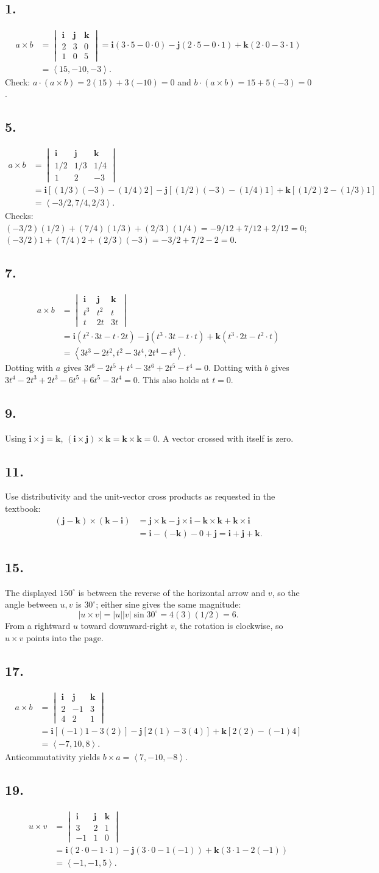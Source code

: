 \documentclass[11pt]{article}
\newcommand{\ex}[1]{\subsection*{#1.}}
\newcommand{\ans}[1]{\boxed{#1}}
\newcommand{\vv}[1]{\left\langle #1\right\rangle}
\newcommand{\ii}{\mathbf i}\newcommand{\jj}{\mathbf j}\newcommand{\kk}{\mathbf k}
\newcommand{\cp}[6]{\begin{vmatrix}\ii&\jj&\kk\\#1&#2&#3\\#4&#5&#6\end{vmatrix}}
\begin{document}
\ex{1}
\begin{align*}a\times b&=\cp{2}{3}{0}{1}{0}{5}
=\ii(3\cdot5-0\cdot0)-\jj(2\cdot5-0\cdot1)+\kk(2\cdot0-3\cdot1)\\&=\ans{\vv{15,-10,-3}}.
\end{align*}
Check: $a\cdot(a\times b)=2(15)+3(-10)=0$ and $b\cdot(a\times b)=15+5(-3)=0$.
\ex{5}
\begin{align*}a\times b&=\cp{1/2}{1/3}{1/4}{1}{2}{-3}\\
&=\ii[(1/3)(-3)-(1/4)2]-\jj[(1/2)(-3)-(1/4)1]+\kk[(1/2)2-(1/3)1]\\
&=\ans{\vv{-3/2,7/4,2/3}}.
\end{align*}
Checks: $(-3/2)(1/2)+(7/4)(1/3)+(2/3)(1/4)=-9/12+7/12+2/12=0$;
$(-3/2)1+(7/4)2+(2/3)(-3)=-3/2+7/2-2=0$.
\ex{7}
\begin{align*}a\times b&=\cp{t^3}{t^2}{t}{t}{2t}{3t}\\&=\ii(t^2\cdot3t-t\cdot2t)-\jj(t^3\cdot3t-t\cdot t)+\kk(t^3\cdot2t-t^2\cdot t)\\&=\ans{\vv{3t^3-2t^2,t^2-3t^4,2t^4-t^3}}.
\end{align*}
Dotting with $a$ gives $3t^6-2t^5+t^4-3t^6+2t^5-t^4=0$. Dotting with $b$ gives $3t^4-2t^3+2t^3-6t^5+6t^5-3t^4=0$. This also holds at $t=0$.
\ex{9}
Using $\ii\times\jj=\kk$, $(\ii\times\jj)\times\kk=\kk\times\kk=\ans0$. A vector crossed with itself is zero.
\ex{11}
Use distributivity and the unit-vector cross products as requested in the textbook:
\begin{align*}(\jj-\kk)\times(\kk-\ii)&=\jj\times\kk-\jj\times\ii-\kk\times\kk+\kk\times\ii\\&=\ii-(-\kk)-0+\jj=\ans{\ii+\jj+\kk}.
\end{align*}
\ex{15}
The displayed $150^\circ$ is between the reverse of the horizontal arrow and $v$, so the angle between $u,v$ is $30^\circ$; either sine gives the same magnitude:
\[|u\times v|=|u||v|\sin30^\circ=4(3)(1/2)=\ans6.\]
From a rightward $u$ toward downward-right $v$, the rotation is clockwise, so $\ans{u\times v\text{ points into the page}}$.
\ex{17}
\begin{align*}a\times b&=\cp{2}{-1}{3}{4}{2}{1}\\&=\ii[(-1)1-3(2)]-\jj[2(1)-3(4)]+\kk[2(2)-(-1)4]\\&=\ans{\vv{-7,10,8}}.
\end{align*}
Anticommutativity yields $\ans{b\times a=\vv{7,-10,-8}}$.
\ex{19}
\begin{align*}u\times v&=\cp{3}{2}{1}{-1}{1}{0}\\&=\ii(2\cdot0-1\cdot1)-\jj(3\cdot0-1(-1))+\kk(3\cdot1-2(-1))\\&=\vv{-1,-1,5}.
\end{align*}
\end{document}
